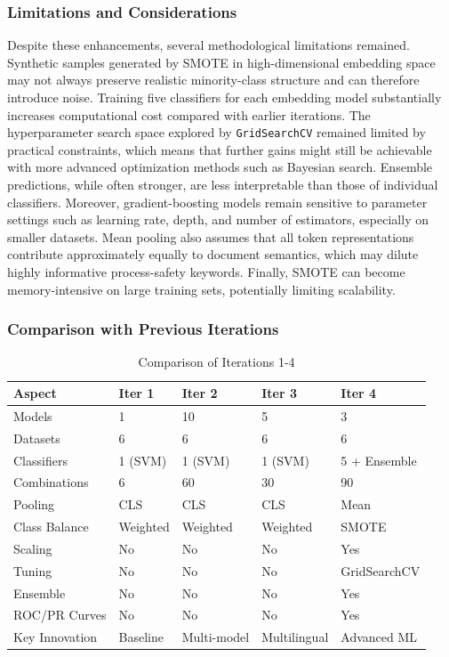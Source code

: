 \documentclass[11pt, titlepage, bibliography=totoc]{scrreprt}
\begin{document}
\subsubsection{Limitations and Considerations}
Despite these enhancements, several methodological limitations remained. Synthetic samples generated by SMOTE in high-dimensional embedding space may not always preserve realistic minority-class structure and can therefore introduce noise. Training five classifiers for each embedding model substantially increases computational cost compared with earlier iterations. The hyperparameter search space explored by \texttt{GridSearchCV} remained limited by practical constraints, which means that further gains might still be achievable with more advanced optimization methods such as Bayesian search. Ensemble predictions, while often stronger, are less interpretable than those of individual classifiers. Moreover, gradient-boosting models remain sensitive to parameter settings such as learning rate, depth, and number of estimators, especially on smaller datasets. Mean pooling also assumes that all token representations contribute approximately equally to document semantics, which may dilute highly informative process-safety keywords. Finally, SMOTE can become memory-intensive on large training sets, potentially limiting scalability.

\subsubsection{Comparison with Previous Iterations}

\begin{table}[htbp]
\centering
\small
\begin{tabular}{@{}lllll@{}}
\toprule
\textbf{Aspect} & \textbf{Iter 1} & \textbf{Iter 2} & \textbf{Iter 3} & \textbf{Iter 4} \\
\midrule
Models & 1 & 10 & 5 & 3 \\
Datasets & 6 & 6 & 6 & 6 \\
Classifiers & 1 (SVM) & 1 (SVM) & 1 (SVM) & 5 + Ensemble \\
Combinations & 6 & 60 & 30 & 90 \\
Pooling & CLS & CLS & CLS & Mean \\
Class Balance & Weighted & Weighted & Weighted & SMOTE \\
Scaling & No & No & No & Yes \\
Tuning & No & No & No & GridSearchCV \\
Ensemble & No & No & No & Yes \\
ROC/PR Curves & No & No & No & Yes \\
Key Innovation & Baseline & Multi-model & Multilingual & Advanced ML \\
\bottomrule
\end{tabular}
\caption{Comparison of Iterations 1-4}
\label{tab:iteration_comparison_4}
\end{table}
\end{document}
